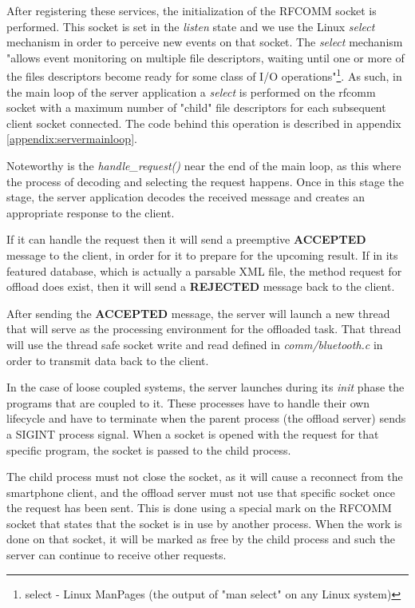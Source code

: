 After registering these services, the initialization of the RFCOMM socket is performed. This socket is set in the \textit{listen} state and we use the Linux \textit{select}\cite{ostrowski2000mechanism} mechanism in order to perceive new events on that socket. The \textit{select} mechanism "allows event monitoring on multiple file descriptors, waiting until one or more of the files descriptors become ready for some class of I/O operations"\footnote{select - Linux ManPages (the output of "man select" on any Linux system)}. As such, in the main loop of the server application a \textit{select} is performed on the rfcomm socket with a maximum number of "child" file descriptors for each subsequent client socket connected. The code behind this operation is described in appendix \ref{appendix:servermainloop}.

Noteworthy is the \textit{handle_request()} near the end of the main loop, as this where the process of decoding and selecting the request happens. Once in this stage the stage, the server application decodes the received message and creates an appropriate response to the client.

If it can handle the request then it will send a preemptive \textbf{ACCEPTED} message to the client, in order for it to prepare for the upcoming result. If in its featured database, which is actually a parsable XML file, the method request for offload does exist, then it will send a \textbf{REJECTED} message back to the client.

After sending the \textbf{ACCEPTED} message, the server will launch a new thread that will serve as the processing environment for the offloaded task. That thread will use the thread safe socket write and read defined in \textit{comm/bluetooth.c} in order to transmit data back to the client.

In the case of loose coupled systems, the server launches during its \textit{init} phase the programs that are coupled to it. These processes have to handle their own lifecycle and have to terminate when the parent process (the offload server) sends a SIGINT process signal. When a socket is opened with the request for that specific program, the socket is passed to the child process. 

The child process must not close the socket, as it will cause a reconnect from the smartphone client, and the offload server must not use that specific socket once the request has been sent. This is done using a special mark on the RFCOMM socket that states that the socket is in use by another process. When the work is done on that socket, it will be marked as free by the child process and such the server can continue to receive other requests.

